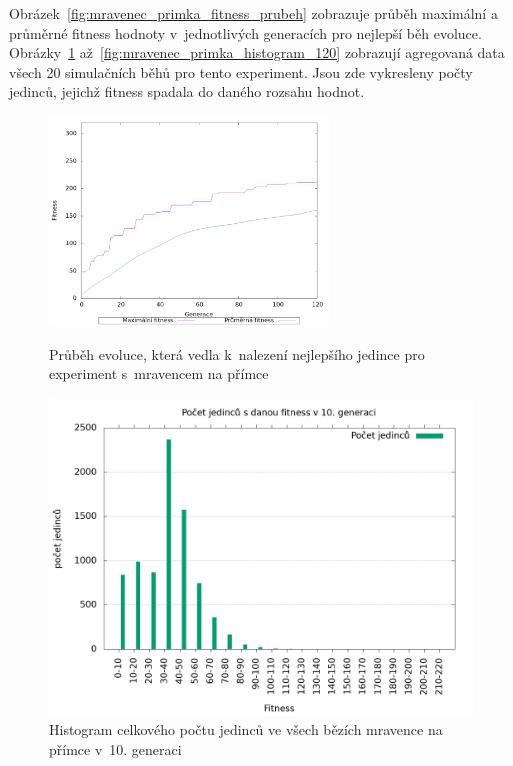 Obrázek~\ref{fig:mravenec_primka_fitness_prubeh} zobrazuje průběh maximální a průměrné fitness hodnoty v~jednotlivých generacích pro nejlepší běh evoluce.
Obrázky~\ref{fig:mravenec_primka_histogram_10} až~\ref{fig:mravenec_primka_histogram_120} zobrazují agregovaná data všech 20 simulačních běhů pro tento experiment.
Jsou zde vykresleny počty jedinců, jejichž fitness spadala do daného rozsahu hodnot.

\begin{figure}[h]
    \begin{minipage}[c]{0.48\linewidth}
    {\includegraphics[width=20em]{obrazky/mravenec_primka_fitness_prubeh.png}}
        \caption{
        Průběh evoluce, která vedla k~nalezení nejlepšího jedince pro experiment s~mravencem na přímce
        }
        \label{fig:mravenec_primka_fitness_prubeh}

    \end{minipage}
    \hfill
    \begin{minipage}[c]{0.48\linewidth}
        \includegraphics[width=\linewidth]{obrazky/mravenec_primka_fitnessHistogram10.png}
        \caption{Histogram celkového počtu jedinců ve všech bězích mravence na přímce v~10. generaci}
        \label{fig:mravenec_primka_histogram_10}
    \end{minipage}
\end{figure}

